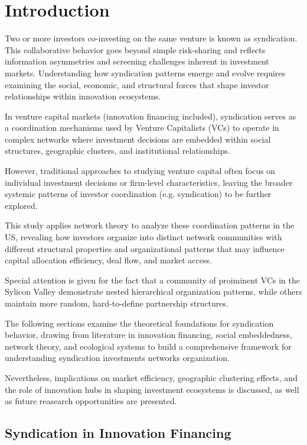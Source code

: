 \section{Introduction}

Two or more investors co-investing on the same venture is known as syndication. This collaborative behavior goes beyond simple risk-sharing and reflects information asymmetries and screening challenges inherent in investment markets. Understanding how syndication patterns emerge and evolve requires examining the social, economic, and structural forces that shape investor relationships within innovation ecosystems.

In venture capital markets (innovation financing included), syndication serves as a coordination mechanisms used by Venture Capitalists (VCs) to operate in complex networks where investment decisions are embedded within social structures, geographic clusters, and institutional relationships. 

However, traditional approaches to studying venture capital often focus on individual investment decisions or firm-level characteristics, leaving the broader systemic patterns of investor coordination (e.g. syndication) to be further explored.

This study applies network theory to analyze these coordination patterns in the US, revealing how investors organize into distinct network communities with different structural properties and organizational patterns that may influence capital allocation efficiency, deal flow, and market access.

Special attention is given for the fact that a community of proiminent VCs in the Sylicon Valley  demonstrate nested hierarchical organization patterns, while others maintain more random, hard-to-define partnership structures.

The following sections examine the theoretical foundations for syndication behavior, drawing from literature in innovation financing, social embeddedness, network theory, and ecological systems to build a comprehensive framework for understanding syndication investments networks organization. 

Nevertheless, implications on market efficiency, geographic clustering effects, and the role of innovation hubs in shaping investment ecosystems is discussed, as well as future reasearch opportunities are presented.

\subsection{Syndication in Innovation Financing}


